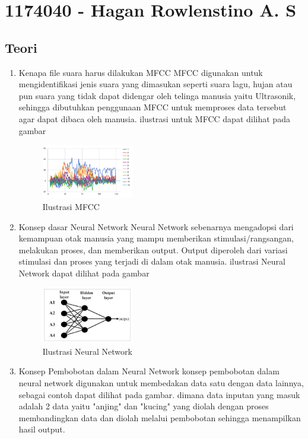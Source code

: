 \section{1174040 - Hagan Rowlenstino A. S}
    \subsection{Teori}
    \begin{enumerate}
        \item Kenapa file suara harus dilakukan MFCC
        \subitem MFCC digunakan untuk mengidentifikasi jenis suara yang dimasukan seperti suara lagu, hujan atau pun suara yang tidak dapat didengar oleh telinga manusia yaitu Ultrasonik, sehingga dibutuhkan penggunaan MFCC untuk memproses data tersebut agar dapat dibaca oleh manusia. ilustrasi untuk MFCC dapat dilihat pada gambar
        
        \begin{figure}[H]
            \includegraphics[width=4cm]{figures/1174040/chapter6/teori1.png}
            \centering
              \caption{Ilustrasi MFCC}
        \end{figure}
        
        \item Konsep dasar Neural Network
        \subitem Neural Network sebenarnya mengadopsi dari kemampuan otak manusia yang mampu memberikan stimulasi/rangsangan, melakukan proses, dan memberikan output. Output diperoleh dari variasi stimulasi dan proses yang terjadi di dalam otak manusia.
        ilustrasi Neural Network dapat dilihat pada gambar
        
        \begin{figure}[H]
            \includegraphics[width=4cm]{figures/1174040/chapter6/teori2.png}
            \centering
              \caption{Ilustrasi Neural Network}
        \end{figure}
        
        \item Konsep Pembobotan dalam Neural Network
        \subitem konsep pembobotan dalam neural network digunakan untuk membedakan data satu dengan data lainnya, sebagai contoh dapat dilihat pada gambar. dimana data inputan yang masuk adalah 2 data yaitu "anjing" dan "kucing" yang diolah dengan proses membandingkan data dan diolah melalui pembobotan sehingga menampilkan hasil output.
        

\end{enumerate}
